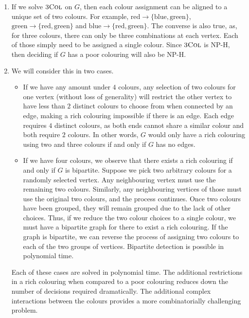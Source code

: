 \documentclass{article}
\begin{document}
\begin{solution}
\begin{enumerate}[label = (\alph*)]
    \item If we solve $\mathsf{\textsc{3Col}}$ on $G$, then each colour assignment can be aligned to a unique set of two colours. For example, $\text{red} \to \{\text{blue}, \text{green}\}$, $\text{green} \to \{\text{red}, \text{green}\}$ and $\text{blue} \to \{\text{red}, \text{green}\}$. The converse is also true, as, for three colours, there can only be three combinations at each vertex. Each of those simply need to be assigned a single colour. Since $\mathsf{\textsc{3Col}}$ is NP-H, then deciding if $G$ has a poor colouring will also be NP-H.

    \item We will consider this in two cases.
\begin{itemize}
	\item If we have any amount under $4$ colours, any selection of two colours for one vertex (without loss of generality) will restrict the other vertex to have less than $2$ distinct colours to choose from when connected by an edge, making a rich colouring impossible if there is an edge. Each edge requires $4$ distinct colours, as both ends cannot share a similar colour and both require $2$ colours. In other words, $G$ would only have a rich colouring using two and three colours if and only if $G$ has no edges.
	\item If we have four colours, we observe that there exists a rich colouring if and only if $G$ is bipartite. Suppose we pick two arbitrary colours for a randomly selected vertex. Any neighbouring vertex must use the remaining two colours. Similarly, any neighbouring vertices of those must use the original two colours, and the process continues. Once two colours have been grouped, they will remain grouped due to the lack of other choices. Thus, if we reduce the two colour choices to a single colour, we must have a bipartite graph for there to exist a rich colouring. If the graph is bipartite, we can reverse the process of assigning two colours to each of the two groups of vertices. Bipartite detection is possible in polynomial time.
\end{itemize}

Each of these cases are solved in polynomial time. The additional restrictions in a rich colouring when compared to a poor colouring reduces down the number of decisions required dramatically. The additional complex interactions between the colours provides a more combinatorially challenging problem.


\end{enumerate}
\end{solution}
\end{document}
